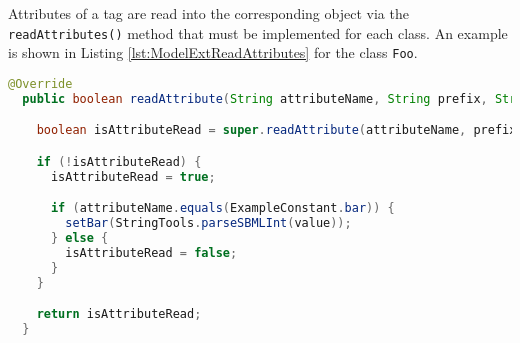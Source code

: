 Attributes of a tag are read into the corresponding object via the \texttt{readAttributes()} method that must be implemented for each class.
An example is shown in Listing \ref{lst:ModelExtReadAttributes} for the class \texttt{Foo}.

\begin{lstlisting}[language=Java,caption={Method to read the XML attributes},label={lst:ModelExtReadAttributes}]
  @Override
  public boolean readAttribute(String attributeName, String prefix, String value) {

    boolean isAttributeRead = super.readAttribute(attributeName, prefix, value);

    if (!isAttributeRead) {
      isAttributeRead = true;

      if (attributeName.equals(ExampleConstant.bar)) {
        setBar(StringTools.parseSBMLInt(value));
      } else {
        isAttributeRead = false;
      }
    }

    return isAttributeRead;
  }
\end{lstlisting}



